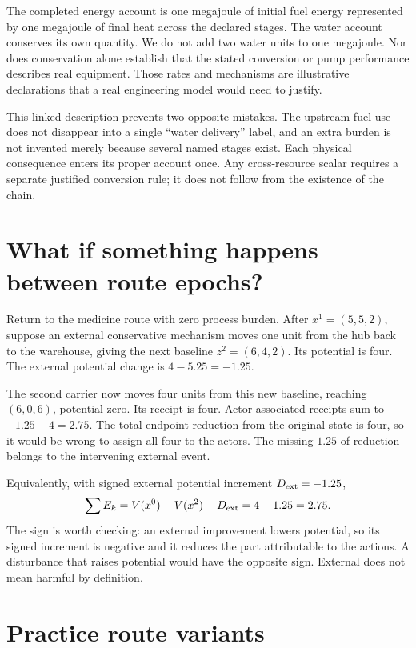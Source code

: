 The completed energy account is one megajoule of initial fuel energy represented by one megajoule of final heat across the declared stages. The water account conserves its own quantity. We do not add two water units to one megajoule. Nor does conservation alone establish that the stated conversion or pump performance describes real equipment. Those rates and mechanisms are illustrative declarations that a real engineering model would need to justify.

This linked description prevents two opposite mistakes. The upstream fuel use does not disappear into a single ``water delivery'' label, and an extra burden is not invented merely because several named stages exist. Each physical consequence enters its proper account once. Any cross-resource scalar requires a separate justified conversion rule; it does not follow from the existence of the chain.

\section{What if something happens between route epochs?}

Return to the medicine route with zero process burden. After \(x^1=(5,5,2)\), suppose an external conservative mechanism moves one unit from the hub back to the warehouse, giving the next baseline \(z^2=(6,4,2)\). Its potential is four. The external potential change is \(4-5.25=-1.25\).

The second carrier now moves four units from this new baseline, reaching \((6,0,6)\), potential zero. Its receipt is four. Actor-associated receipts sum to \(-1.25+4=2.75\). The total endpoint reduction from the original state is four, so it would be wrong to assign all four to the actors. The missing \(1.25\) of reduction belongs to the intervening external event.

Equivalently, with signed external potential increment \(D_{\rm ext}=-1.25\),
\begin{equation}
\sum E_k=V(x^0)-V(x^2)+D_{\rm ext}=4-1.25=2.75.
\end{equation}
The sign is worth checking: an external improvement lowers potential, so its signed increment is negative and it reduces the part attributable to the actions. A disturbance that raises potential would have the opposite sign. External does not mean harmful by definition.

\section{Practice route variants}

